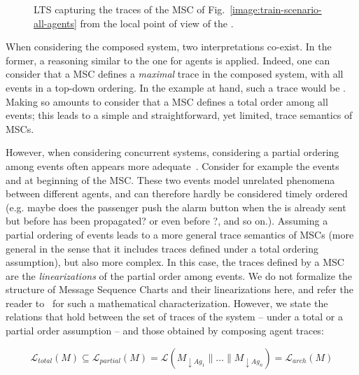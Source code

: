 \vspace{0.5cm}
\begin{figure}[H]\centering
{}
\caption{LTS capturing the traces of the MSC of Fig.~\ref{image:train-scenario-all-agents} from the local point of view of the .\label{image:local-traces-lts}}
\end{figure}

When considering the composed system, two interpretations co-exist. In the former, a reasoning similar to the one for agents is applied. Indeed, one can consider that a MSC defines a \emph{maximal} trace in the composed system, with all events in a top-down ordering. In the example at hand, such a trace would be . Making so amounts to consider that a MSC defines a total order among all events; this leads to a simple and straightforward, yet limited, trace semantics of MSCs.

However, when considering concurrent systems, considering a partial ordering among events often appears more adequate~\cite{ITU:1996, Uchitel:2003}. Consider for example the events  and  at beginning of the MSC. These two events model unrelated phenomena between different agents, and can therefore hardly be considered timely ordered (e.g. maybe does the passenger push the alarm button when the  is already sent but before  has been propagated? or even before ?, and so on.). Assuming a partial ordering of events leads to a more general trace semantics of MSCs (more general in the sense that it includes traces defined under a total ordering assumption), but also more complex. In this case, the traces defined by a MSC are the \emph{linearizations} of the partial order among events. We do not formalize the structure of Message Sequence Charts and their linearizations here, and refer the reader to~\cite{Uchitel:2003} for such a mathematical characterization. However, we state the relations that hold between the set of traces of the system -- under a total or a partial order assumption -- and those obtained by composing agent traces:

\begin{equation}
\label{equation:msc-composition}
\mathcal{L}_{total}(M) \subseteq \mathcal{L}_{partial}(M) = \mathcal{L}(M_{\downarrow Ag_1} \parallel \ldots \parallel M_{\downarrow Ag_n}) = \mathcal{L}_{arch}(M)
\end{equation}

